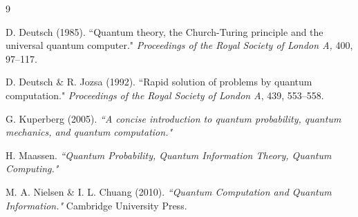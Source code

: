 \begin{thebibliography}{9}

     D. Deutsch (1985). ``Quantum theory, the Church-Turing principle and the universal quantum computer." \textit{Proceedings of the Royal Society of London A,} 400, 97–117.

     D. Deutsch \& R. Jozsa (1992). ``Rapid solution of problems by quantum computation." \textit{Proceedings of the Royal Society of London A}, 439, 553–558. 
    
     G. Kuperberg (2005). \textit{``A concise introduction to quantum probability, quantum mechanics, and quantum computation."} 

     H. Maassen. \textit{``Quantum Probability, Quantum Information Theory, Quantum Computing."}

     M. A. Nielsen \& I. L. Chuang (2010). \textit{``Quantum Computation and Quantum Information."} Cambridge University Press.

\end{thebibliography}